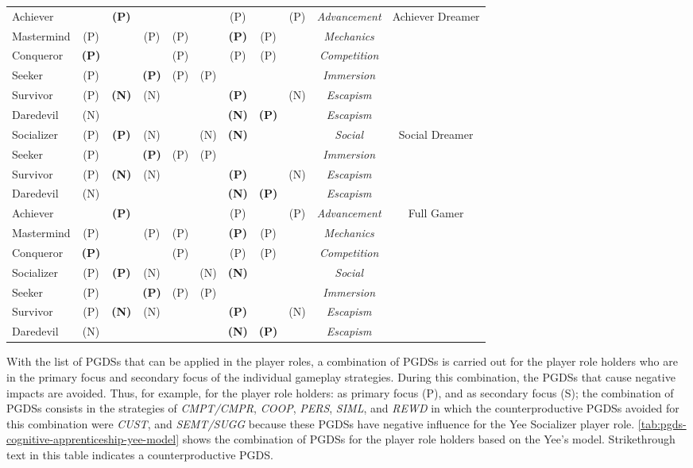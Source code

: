 {\begin{longtable}{|l|cccccccc|c|c|}
Achiever& &\textbf{(P)}& & & &(P)& &(P)&\emph{Advancement}&\multirow{6}{*}{Achiever Dreamer}\tabularnewline
Mastermind&(P)& &(P)&(P)& &\textbf{(P)}&(P)& &\emph{Mechanics}& \tabularnewline
Conqueror&\textbf{(P)}& & &(P)& &(P)&(P)& &\emph{Competition}& \tabularnewline
Seeker&(P)& &\textbf{(P)}&(P)&(P)& & & &\emph{Immersion}&\tabularnewline
Survivor&(P)&\textbf{(N)}&(N)& & &\textbf{(P)}& &(N)&\emph{Escapism}& \tabularnewline
Daredevil&(N)& & & & &\textbf{(N)}&\textbf{(P)}& &\emph{Escapism}& \tabularnewline
\hline

Socializer&(P)&\textbf{(P)}&(N)& &(N)&\textbf{(N)}& & &\emph{Social}&\multirow{4}{*}{Social Dreamer}\tabularnewline
Seeker&(P)& &\textbf{(P)}&(P)&(P)& & & &\emph{Immersion}&\tabularnewline
Survivor&(P)&\textbf{(N)}&(N)& & &\textbf{(P)}& &(N)&\emph{Escapism}&\tabularnewline
Daredevil&(N)& & & & &\textbf{(N)}&\textbf{(P)}& &\emph{Escapism}&\tabularnewline
\hline

Achiever& &\textbf{(P)}& & & &(P)& &(P)&\emph{Advancement}&\multirow{7}{*}{Full Gamer}\tabularnewline
Mastermind&(P)& &(P)&(P)& &\textbf{(P)}&(P)& &\emph{Mechanics}& \tabularnewline
Conqueror&\textbf{(P)}& & &(P)& &(P)&(P)& &\emph{Competition}& \tabularnewline
Socializer&(P)&\textbf{(P)}&(N)& &(N)&\textbf{(N)}& & &\emph{Social}&\tabularnewline
Seeker&(P)& &\textbf{(P)}&(P)&(P)& & & &\emph{Immersion}&\tabularnewline
Survivor&(P)&\textbf{(N)}&(N)& & &\textbf{(P)}& &(N)&\emph{Escapism}& \tabularnewline
Daredevil&(N)& & & & &\textbf{(N)}&\textbf{(P)}& &\emph{Escapism}& \tabularnewline
\hline

\end{longtable}
}

With the list of PGDSs that can be applied in the player roles, a combination of PGDSs is carried out for the player role holders who are in the primary focus and secondary focus of the individual gameplay strategies. During this combination, the PGDSs that cause negative impacts are avoided. Thus, for example, for the player role holders:  as primary focus (P), and  as secondary focus (S); the combination of PGDSs consists in the strategies of \emph{CMPT/CMPR}, \emph{COOP}, \emph{PERS}, \emph{SIML}, and \emph{REWD} in which the counterproductive PGDSs avoided for this combination were \emph{CUST}, and \emph{SEMT/SUGG} because these PGDSs have negative influence for the Yee Socializer player role. \autoref{tab:pgds-cognitive-apprenticeship-yee-model} shows the combination of PGDSs for the player role holders based on the Yee's model. Strikethrough text in this table indicates a counterproductive PGDS. 

